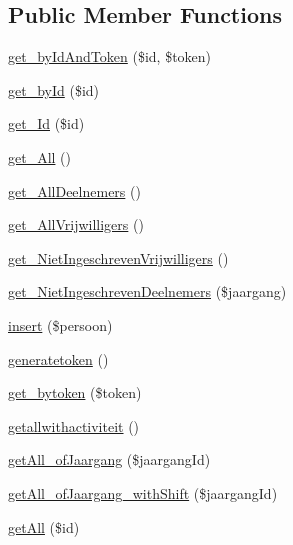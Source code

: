 \subsection*{Public Member Functions}
\begin{DoxyCompactItemize}
\item 
\mbox{\hyperlink{class_persoon__model_a4fe7a2f8ac42cd4901ef68b06358d93f}{get\+\_\+by\+Id\+And\+Token}} (\$id, \$token)
\item 
\mbox{\hyperlink{class_persoon__model_a98d28a4d9a29d40c5a8aa0176f19a919}{get\+\_\+by\+Id}} (\$id)
\item 
\mbox{\hyperlink{class_persoon__model_a8d14f8e8d18daadab52042074396a6b8}{get\+\_\+\+Id}} (\$id)
\item 
\mbox{\hyperlink{class_persoon__model_a7e94dd1f7edfacea0d0814ff027b7e04}{get\+\_\+\+All}} ()
\item 
\mbox{\hyperlink{class_persoon__model_a7e0633aa62a76b8fb9bf35c6167a2a0f}{get\+\_\+\+All\+Deelnemers}} ()
\item 
\mbox{\hyperlink{class_persoon__model_a34374012facb64562423057666ed535d}{get\+\_\+\+All\+Vrijwilligers}} ()
\item 
\mbox{\hyperlink{class_persoon__model_ae20838d9cd61c63ac26fdb07f4b7bff4}{get\+\_\+\+Niet\+Ingeschreven\+Vrijwilligers}} ()
\item 
\mbox{\hyperlink{class_persoon__model_a44c616f540f2ca1deb731244c9ff648d}{get\+\_\+\+Niet\+Ingeschreven\+Deelnemers}} (\$jaargang)
\item 
\mbox{\hyperlink{class_persoon__model_abb16337bee193e227f25cb9e37ac9394}{insert}} (\$persoon)
\item 
\mbox{\hyperlink{class_persoon__model_a40ea86b0c55c207673f65d23a4a8e98d}{generatetoken}} ()
\item 
\mbox{\hyperlink{class_persoon__model_aad1045b9fabfabcb3090fb0b0b17a6e6}{get\+\_\+bytoken}} (\$token)
\item 
\mbox{\hyperlink{class_persoon__model_a20a10592218dbf11fd43c955ce5fcee1}{getallwithactiviteit}} ()
\item 
\mbox{\hyperlink{class_persoon__model_aba5a7a9b6a803620d0fddcbfffa83148}{get\+All\+\_\+of\+Jaargang}} (\$jaargang\+Id)
\item 
\mbox{\hyperlink{class_persoon__model_afa062e8195502a034cfa2780c6763cf6}{get\+All\+\_\+of\+Jaargang\+\_\+with\+Shift}} (\$jaargang\+Id)
\item 
\mbox{\hyperlink{class_persoon__model_a9169319ec748964dc67f0f640d182250}{get\+All}} (\$id)
\end{DoxyCompactItemize}


